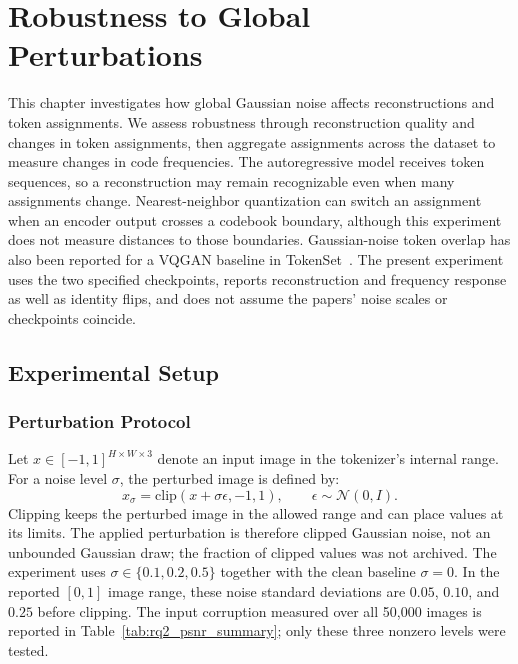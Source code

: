 \chapter{Robustness to Global Perturbations}
\label{ch:rq2}

This chapter investigates how global Gaussian noise affects reconstructions and
token assignments. We assess robustness through reconstruction quality and
changes in token assignments, then aggregate assignments across the dataset to
measure changes in code frequencies. The autoregressive model receives token
sequences, so a reconstruction may remain recognizable even when many
assignments change. Nearest-neighbor quantization can switch an assignment when
an encoder output crosses a codebook boundary, although this experiment does
not measure distances to those boundaries.
Gaussian-noise token overlap has also been reported for a VQGAN baseline in
TokenSet~\cite{geng2025tokenize}. The present experiment uses the two specified
checkpoints, reports reconstruction and frequency response as well as identity
flips, and does not assume the papers' noise scales or checkpoints coincide.

\section{Experimental Setup}
\label{sec:rq2_setup}

\subsection{Perturbation Protocol}
\label{subsec:rq2_perturbation_protocol}

Let $x \in [-1,1]^{H \times W \times 3}$ denote an input image in the
tokenizer's internal range. For a noise level $\sigma$, the perturbed image is
defined by:
\begin{equation}
    x_{\sigma} = \mathrm{clip}(x + \sigma \epsilon, -1, 1),
    \qquad
    \epsilon \sim \mathcal{N}(0, I).
    \label{eq:rq2_global_noise}
\end{equation}
Clipping keeps the perturbed image in the allowed range and can place values at
its limits. The applied perturbation is therefore clipped Gaussian noise,
not an unbounded Gaussian draw; the fraction of clipped values was not archived.
The experiment uses $\sigma\in\{0.1,0.2,0.5\}$ together with the
clean baseline $\sigma=0$. In the reported $[0,1]$ image range, these noise
standard deviations are $0.05$, $0.10$, and $0.25$ before clipping. The input
corruption measured over all 50{,}000 images is reported in
Table~\ref{tab:rq2_psnr_summary}; only these three nonzero levels were tested.

